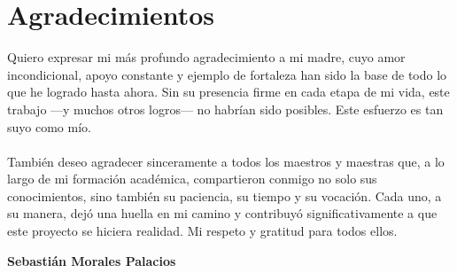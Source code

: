 \chapter{Agradecimientos}
Quiero expresar mi más profundo agradecimiento a mi madre, cuyo amor incondicional, apoyo constante y ejemplo de fortaleza han sido la base de todo lo que he logrado hasta ahora. Sin su presencia firme en cada etapa de mi vida, este trabajo —y muchos otros logros— no habrían sido posibles. Este esfuerzo es tan suyo como mío. \\ \\
También deseo agradecer sinceramente a todos los maestros y maestras que, a lo largo de mi formación académica, compartieron conmigo no solo sus conocimientos, sino también su paciencia, su tiempo y su vocación. Cada uno, a su manera, dejó una huella en mi camino y contribuyó significativamente a que este proyecto se hiciera realidad. Mi respeto y gratitud para todos ellos.

             
\begin{flushright}  
	\textbf{Sebastián Morales Palacios} 
\end{flushright}